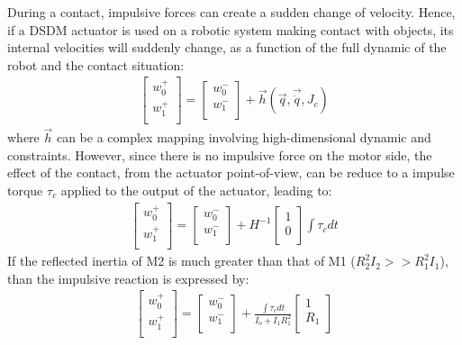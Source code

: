 During a contact, impulsive forces can create a sudden change of velocity. Hence, if a DSDM actuator is used on a robotic system making contact with objects, its internal velocities will suddenly change, as a function of the full dynamic of the robot and the contact situation:
%
\begin{align}
\left[
\begin{array}{c}
w_0^+ \\
w_1^+ \\
\end{array}
\right] = 
\left[
\begin{array}{c}
w_0^- \\
w_1^- \\
\end{array}
\right] +
\vec{h}( \vec{q} , \vec{\dot{q}} , J_c )
\end{align}
%
where $\vec{h}$ can be a complex mapping involving high-dimensional dynamic and constraints. However, since there is no impulsive force on the motor side, the effect of the contact, from the actuator point-of-view, can be reduce to a impulse torque $\tau_c$ applied to the output of the actuator, leading to:
%
\begin{align}
\left[
\begin{array}{c}
w_0^+ \\
w_1^+ \\
\end{array}
\right] = 
\left[
\begin{array}{c}
w_0^- \\
w_1^- \\
\end{array}
\right] +
H^{-1} \left[
\begin{array}{c}
1 \\
0 \\
\end{array}
\right] \int{\tau_c dt}
\end{align}
%
If the reflected inertia of M2 is much greater than that of M1 ($R_2^2 I_2 >> R_1^2 I_1 $), than the impulsive reaction is expressed by:
%
\begin{align}
\left[
\begin{array}{c}
w_0^+ \\
w_1^+ \\
\end{array}
\right] = 
\left[
\begin{array}{c}
w_0^- \\
w_1^- \\
\end{array}
\right] +
\frac{ \int{\tau_c dt} }{ I_o + I_1 R_1^2} 
\left[
\begin{array}{c}
1 \\
R_1 \\
\end{array}
\right] 
\end{align}

